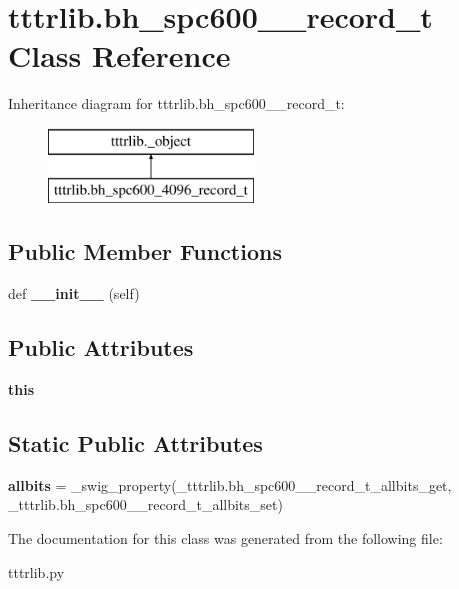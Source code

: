 \hypertarget{classtttrlib_1_1bh__spc600__4096__record__t}{}\section{tttrlib.\+bh\+\_\+spc600\+\_\+\_\+record\+\_\+t Class Reference}
\label{classtttrlib_1_1bh__spc600__4096__record__t}
Inheritance diagram for tttrlib.\+bh\+\_\+spc600\+\_\+\_\+record\+\_\+t\+:\begin{figure}[H]
\begin{center}
\leavevmode
\includegraphics[height=2.000000cm]{classtttrlib_1_1bh__spc600__4096__record__t}
\end{center}
\end{figure}
\subsection*{Public Member Functions}
\begin{DoxyCompactItemize}
\item 
\mbox{\label{classtttrlib_1_1bh__spc600__4096__record__t_aa34db3978dda4b559273af039dfd39a1}} 
def {\bfseries \+\_\+\+\_\+init\+\_\+\+\_\+} (self)
\end{DoxyCompactItemize}
\subsection*{Public Attributes}
\begin{DoxyCompactItemize}
\item 
\mbox{\label{classtttrlib_1_1bh__spc600__4096__record__t_a24167845647b2247c0b6068edae36ab2}} 
{\bfseries this}
\end{DoxyCompactItemize}
\subsection*{Static Public Attributes}
\begin{DoxyCompactItemize}
\item 
\mbox{\label{classtttrlib_1_1bh__spc600__4096__record__t_a9d7219ad844a149e606963aae8043475}} 
{\bfseries allbits} = \+\_\+swig\+\_\+property(\+\_\+tttrlib.\+bh\+\_\+spc600\+\_\+\_\+record\+\_\+t\+\_\+allbits\+\_\+get, \+\_\+tttrlib.\+bh\+\_\+spc600\+\_\+\_\+record\+\_\+t\+\_\+allbits\+\_\+set)
\end{DoxyCompactItemize}


The documentation for this class was generated from the following file\+:\begin{DoxyCompactItemize}
\item 
tttrlib.\+py\end{DoxyCompactItemize}
